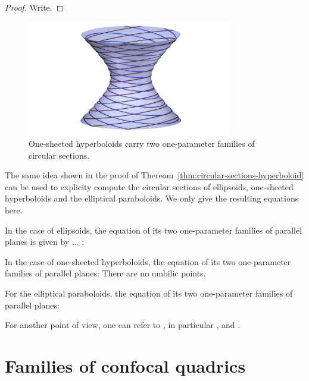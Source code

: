 \documentclass[10pt, a4paper]{article}
\theoremstyle{BoldTopSpacing}
\theoremstyle{BoldTopSpacing}
\theoremstyle{BoldTopSpacing}
\theoremstyle{BoldTopBottomSpacing}
\theoremstyle{BoldTopSpacing}
\theoremstyle{BoldTopBottomSpacing}
\theoremstyle{remark}
\begin{document}
\begin{proof}
    Write.
\end{proof}


\begin{figure}[H]
    \centering
    \includegraphics[width=0.8\textwidth]{circles_sections_of_one_sheeted_hyperboloid.png}
    \caption{One-sheeted hyperboloids carry two one-parameter families of circular sections.}
    \label{fig:circular_sections_one_sheeted}
\end{figure}

The same idea shown in the proof of Thereom~\ref{thm:circular-sections-hyperboloid} can be used to explicity compute the circular sections of ellipsoids, one-sheeted hyperboloids and the elliptical paraboloids. We only give the resulting equations here. \par
In the case of ellipsoids, the equation of its two one-parameter families of parallel planes is given by ... \cite{geometryIII}: \par
In the case of one-sheeted hyperboloids, the equation of its two one-parameter families of parallel planes: There are no umbilic points. \par
For the elliptical paraboloids, the equation of its two one-parameter families of parallel planes: \par

For another point of view, one can refer to \cite{nilovSurfaceContainingLine2011}, in particular \cite[\textcolor{CitationColor}{\textit{Lemma~2.1}}]{nilovSurfaceContainingLine2011}, and \cite[\textcolor{CitationColor}{\textit{Lemma~2.6}}]{nilovSurfaceContainingLine2011}.

\pagebreak
\section{Families of confocal quadrics}
\label{sec:confocal-quadrics}
\end{document}
